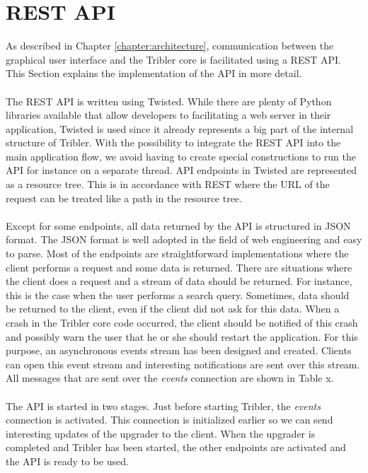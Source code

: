 \section{REST API}
As described in Chapter \ref{chapter:architecture}, communication between the graphical user interface and the Tribler core is facilitated using a REST API. This Section explains the implementation of the API in more detail.\\\\
The REST API is written using Twisted. While there are plenty of Python libraries available that allow developers to facilitating a web server in their application, Twisted is used since it already represents a big part of the internal structure of Tribler. With the possibility to integrate the REST API into the main application flow, we avoid having to create special constructions to run the API for instance on a separate thread. API endpoints in Twisted are represented as a resource tree. This is in accordance with REST where the URL of the request can be treated like a path in the resource tree.\\\\
Except for some endpoints, all data returned by the API is structured in JSON format. The JSON format is well adopted in the field of web engineering and easy to parse. Most of the endpoints are straightforward implementations where the client performs a request and some data is returned. There are situations where the client does a request and a stream of data should be returned. For instance, this is the case when the user performs a search query. Sometimes, data should be returned to the client, even if the client did not ask for this data. When a crash in the Tribler core code occurred, the client should be notified of this crash and possibly warn the user that he or she should restart the application. For this purpose, an asynchronous events stream has been designed and created. Clients can open this event stream and interesting notifications are sent over this stream. All messages that are sent over the \emph{events} connection are shown in Table x.\\\\
The API is started in two stages. Just before starting Tribler, the \emph{events} connection is activated. This connection is initialized earlier so we can send interesting updates of the upgrader to the client. When the upgrader is completed and Tribler has been started, the other endpoints are activated and the API is ready to be used.

